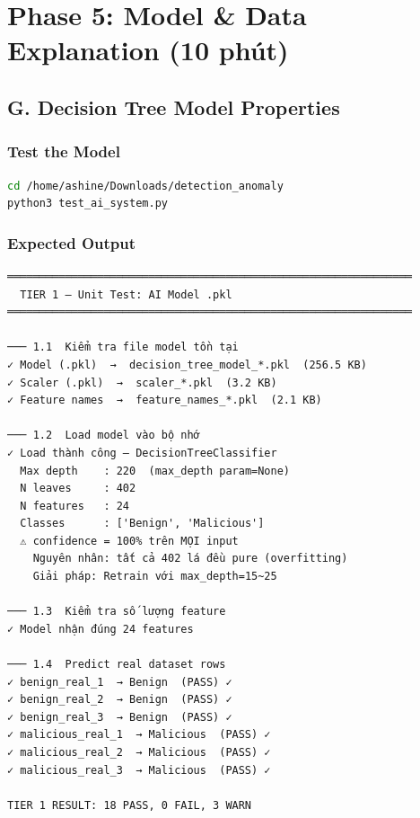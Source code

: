 \documentclass[12pt,a4paper]{article}
\begin{document}
\section{Phase 5: Model \& Data Explanation (10 phút)}

\subsection{G. Decision Tree Model Properties}

\subsubsection{Test the Model}
\begin{lstlisting}[language=bash]
cd /home/ashine/Downloads/detection_anomaly
python3 test_ai_system.py
\end{lstlisting}

\subsubsection{Expected Output}

\begin{verbatim}
═══════════════════════════════════════════════════════════════
  TIER 1 — Unit Test: AI Model .pkl
═══════════════════════════════════════════════════════════════

─── 1.1  Kiểm tra file model tồn tại
✓ Model (.pkl)  →  decision_tree_model_*.pkl  (256.5 KB)
✓ Scaler (.pkl)  →  scaler_*.pkl  (3.2 KB)
✓ Feature names  →  feature_names_*.pkl  (2.1 KB)

─── 1.2  Load model vào bộ nhớ
✓ Load thành công — DecisionTreeClassifier
  Max depth    : 220  (max_depth param=None)
  N leaves     : 402
  N features   : 24
  Classes      : ['Benign', 'Malicious']
  ⚠ confidence = 100% trên MỌI input
    Nguyên nhân: tất cả 402 lá đều pure (overfitting)
    Giải pháp: Retrain với max_depth=15~25

─── 1.3  Kiểm tra số lượng feature
✓ Model nhận đúng 24 features

─── 1.4  Predict real dataset rows
✓ benign_real_1  → Benign  (PASS) ✓
✓ benign_real_2  → Benign  (PASS) ✓
✓ benign_real_3  → Benign  (PASS) ✓
✓ malicious_real_1  → Malicious  (PASS) ✓
✓ malicious_real_2  → Malicious  (PASS) ✓
✓ malicious_real_3  → Malicious  (PASS) ✓

TIER 1 RESULT: 18 PASS, 0 FAIL, 3 WARN
\end{verbatim}
\end{document}
